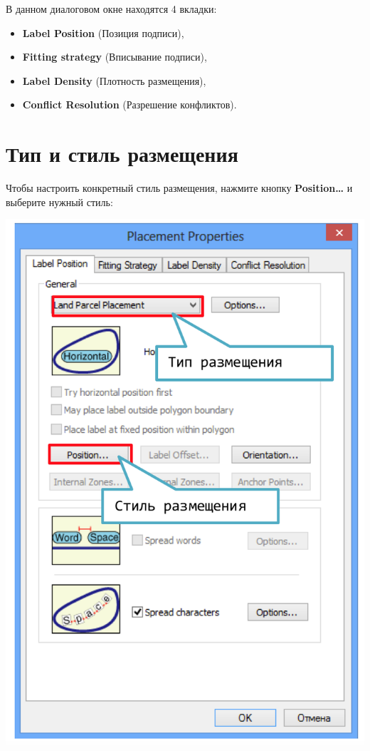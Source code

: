 \documentclass[]{book}
\theoremstyle{definition}
\theoremstyle{definition}
\theoremstyle{definition}
\theoremstyle{remark}
\begin{document}
В данном диалоговом окне находятся 4 вкладки:

\begin{itemize}
\item
  \textbf{Label Position} (Позиция подписи),
\item
  \textbf{Fitting strategy} (Вписывание подписи),
\item
  \textbf{Label Density} (Плотность размещения),
\item
  \textbf{Conflict Resolution} (Разрешение конфликтов).
\end{itemize}

\hypertarget{---}{%
\section{Тип и стиль размещения}\label{---}}

Чтобы настроить конкретный стиль размещения, нажмите кнопку
\textbf{Position\ldots{}} и выберите нужный стиль:

\includegraphics{images/Appendix/image44.png}
\end{document}
